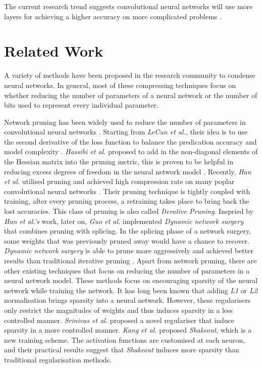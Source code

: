 \documentclass[a4paper,12pt]{report}
\begin{document}
The current research trend suggests convolutional neural networks will use more layers
for achieving a higher accuracy on more complicated problems \cite{Lecun1998gradient,
Krizhevsky, Coates}.

\section{Related Work}
A variety of methods have been proposed in the research community to condense neural networks.
In general, most of these compressing techniques focus on whether reducing
the number of parameters of a neural network or the number of bits used to
represent every individual parameter.

Network pruning has been widely used to reduce the number of
parameters in convolutional neural networks \cite{Lecun1998gradient, Hassibi, Srinivas2015}.
Starting from \textit{LeCun et al.}, their idea is to use the second derivative
of the loss function to balance the predication accuracy and model complexity \cite{Lecun1998gradient}.
\textit{Hassibi et al.} proposed to add in the non-diagonal elements of the
Hessian matrix into the pruning metric, this is proven to be helpful in reducing
excess degrees of freedom in the neural network model \cite{Hassibi}.
Recently, \textit{Han et al.} utilised pruning and achieved
high compression rate on many poplar convolutional neural networks \cite{Han15}.
Their pruning technique is tightly coupled with training, after every pruning process,
a retraining takes place to bring back the lost accuracies.
This class of pruning is also called \textit{Iterative Pruning}.
Inspried by \textit{Han et al.'s} work, later on, \textit{Guo et al.} implemented
\textit{Dynamic network surgery} that combines pruning with splicing.
In the splicing phase of a network surgery, some weights that was previously pruned
away would have a chance to recover.
\textit{Dynamic network surgery} is able to prune more aggressively and achieved
better results than traditional iterative pruning \cite{Guo}.
Apart from network pruning, there are other existing techniques that focus on
reducing the number of parameters in a neural network model.
These methods focus on encouraging sparsity of the neural network while training
the network.
It has long been known that adding \textit{L1} or \textit{L2} normalisation brings
sparsity into a neural network.
However, these regularisers only restrict the magnitudes of weights and thus
induces sparsity in a less controlled manner.
\textit{Srinivas et al.} proposed a novel regulariser that induce sparsity in a
more controlled manner.
\textit{Kang et al.} proposed \textit{Shakeout}, which is a new training scheme.
The activation functions are customised at each neuron, and their practical
results suggest that \textit{Shakeout} induces more sparsity than traditional
regularisation methods.
\end{document}
